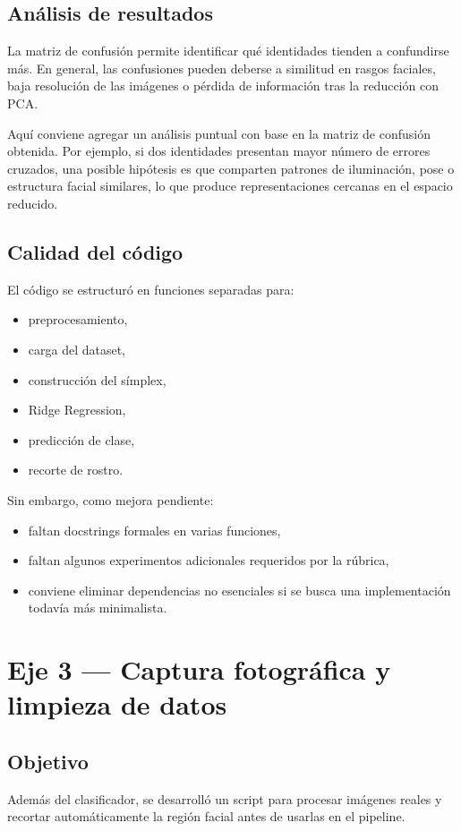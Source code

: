 \documentclass[12pt,a4paper]{article}
\begin{document}
\subsection{Análisis de resultados}
La matriz de confusión permite identificar qué identidades tienden a confundirse más. En general, las confusiones pueden deberse a similitud en rasgos faciales, baja resolución de las imágenes o pérdida de información tras la reducción con PCA.

Aquí conviene agregar un análisis puntual con base en la matriz de confusión obtenida. Por ejemplo, si dos identidades presentan mayor número de errores cruzados, una posible hipótesis es que comparten patrones de iluminación, pose o estructura facial similares, lo que produce representaciones cercanas en el espacio reducido.

\subsection{Calidad del código}
El código se estructuró en funciones separadas para:
\begin{itemize}
    \item preprocesamiento,
    \item carga del dataset,
    \item construcción del símplex,
    \item Ridge Regression,
    \item predicción de clase,
    \item recorte de rostro.
\end{itemize}

Sin embargo, como mejora pendiente:
\begin{itemize}
    \item faltan docstrings formales en varias funciones,
    \item faltan algunos experimentos adicionales requeridos por la rúbrica,
    \item conviene eliminar dependencias no esenciales si se busca una implementación todavía más minimalista.
\end{itemize}

\section{Eje 3 --- Captura fotográfica y limpieza de datos}

\subsection{Objetivo}
Además del clasificador, se desarrolló un script para procesar imágenes reales y recortar automáticamente la región facial antes de usarlas en el pipeline.
\end{document}

